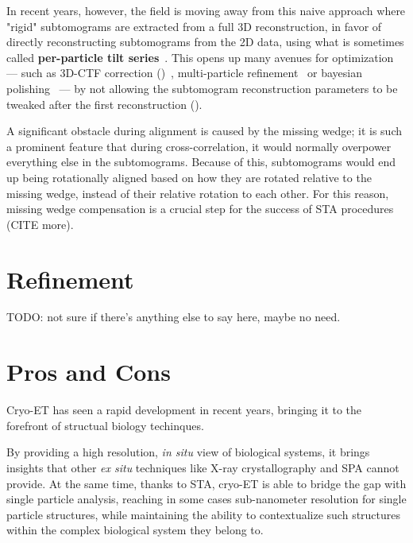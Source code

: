 In recent years, however, the field is moving away from this naive approach where "rigid" subtomograms are extracted from a full 3D reconstruction, in favor of directly reconstructing subtomograms from the 2D data, using what is sometimes called \textbf{per-particle tilt series}~\cite{zivanovBayesianApproachSingleparticle2022,tegunovRealtimeCryoelectronMicroscopy2019,chenCompleteDataProcessing2019}.
This opens up many avenues for optimization --- such as 3D-CTF correction ()~\cite{turonovaEfficient3DCTFCorrection2017}, multi-particle refinement~\cite{tegunovMultiparticleCryoEMRefinement2021} or bayesian polishing~\cite{zivanovBayesianApproachSingleparticle2022} --- by not allowing the subtomogram reconstruction parameters to be tweaked after the first reconstruction ().

A significant obstacle during alignment is caused by the missing wedge; it is such a prominent feature that during cross-correlation, it would normally overpower everything else in the subtomograms.
Because of this, subtomograms would end up being rotationally aligned based on how they are rotated relative to the missing wedge, instead of their relative rotation to each other.
For this reason, missing wedge compensation is a crucial step for the success of STA procedures~\cite{galaz-montoyaAlignmentAlgorithmsPerparticle2016} (CITE more).

\section{Refinement}\label{et_refinement}

TODO: not sure if there's anything else to say here, maybe no need.

\section{Pros and Cons}

Cryo-ET has seen a rapid development in recent years, bringing it to the forefront of structual biology techinques.

By providing a high resolution, \textit{in situ} view of biological systems, it brings insights that other \textit{ex situ} techniques like X-ray crystallography and SPA cannot provide.
At the same time, thanks to STA, cryo-ET is able to bridge the gap with single particle analysis, reaching in some cases sub-nanometer resolution for single particle structures, while maintaining the ability to contextualize such structures within the complex biological system they belong to.

